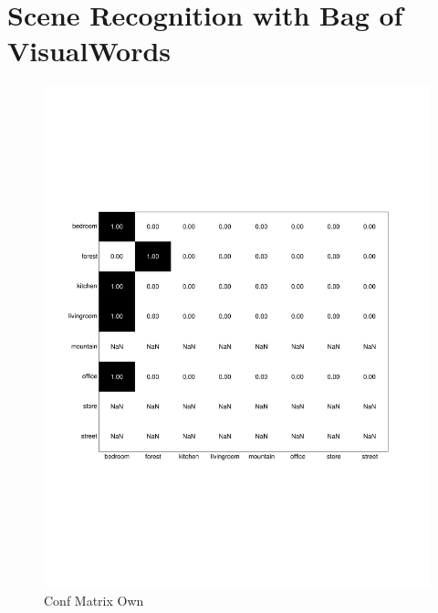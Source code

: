 \documentclass[subfigure,epsfig,fleqn,float,numbers=noenddot]{scrartcl}
\begin{document}
\pagebreak
\section{Scene Recognition with Bag of VisualWords}
\label{sec:2}

\begin{figure}
		\centering
		\includegraphics[width=\textwidth]{img/conf_matrix_own.pdf}
		\caption{Conf Matrix Own}
		\label{fig:conf_matrix_own}
\end{figure}
\end{document}
